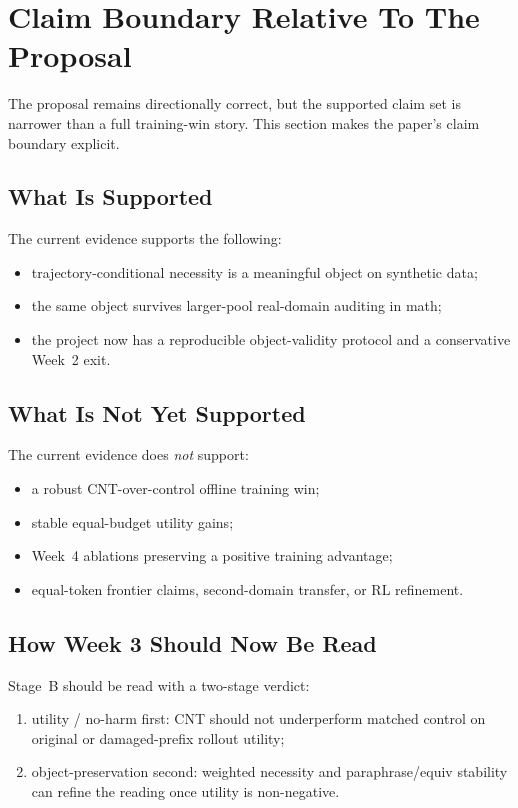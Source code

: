 \section{Claim Boundary Relative To The Proposal}

The proposal remains directionally correct, but the supported claim set is narrower than a full training-win story. This section makes the paper's claim boundary explicit.

\subsection{What Is Supported}

The current evidence supports the following:

\begin{itemize}
  \item trajectory-conditional necessity is a meaningful object on synthetic data;
  \item the same object survives larger-pool real-domain auditing in math;
  \item the project now has a reproducible object-validity protocol and a conservative Week~2 exit.
\end{itemize}

\subsection{What Is Not Yet Supported}

The current evidence does \emph{not} support:

\begin{itemize}
  \item a robust CNT-over-control offline training win;
  \item stable equal-budget utility gains;
  \item Week~4 ablations preserving a positive training advantage;
  \item equal-token frontier claims, second-domain transfer, or RL refinement.
\end{itemize}

\subsection{How Week 3 Should Now Be Read}

Stage~B should be read with a two-stage verdict:

\begin{enumerate}
  \item utility / no-harm first: CNT should not underperform matched control on original or damaged-prefix rollout utility;
  \item object-preservation second: weighted necessity and paraphrase/equiv stability can refine the reading once utility is non-negative.
\end{enumerate}

